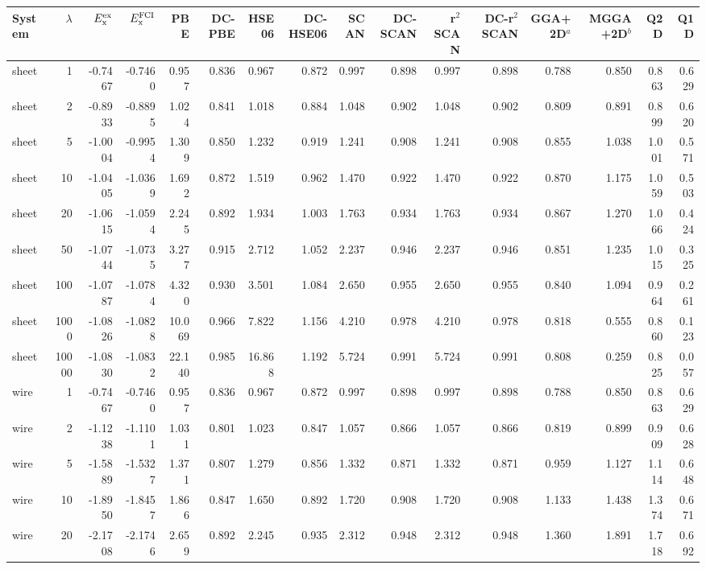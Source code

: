 \begin{tabular}{lrrrrrrrrrrrrrrr}
\toprule
System & $\lambda$ & $E_{\rm x}^{\rm ex}$ & $E_{\rm x}^{\rm FCI}$ & PBE & DC-PBE & HSE06 & DC-HSE06 & SCAN & DC-SCAN & r$^2$SCAN & DC-r$^2$SCAN & GGA+2D$^a$ & MGGA+2D$^b$ & Q2D & Q1D \\
\midrule
sheet & 1 & -0.7467 & -0.7460 & 0.957 & 0.836 & 0.967 & 0.872 & 0.997 & 0.898 & 0.997 & 0.898 & 0.788 & 0.850 & 0.863 & 0.629 \\
sheet & 2 & -0.8933 & -0.8895 & 1.024 & 0.841 & 1.018 & 0.884 & 1.048 & 0.902 & 1.048 & 0.902 & 0.809 & 0.891 & 0.899 & 0.620 \\
sheet & 5 & -1.0004 & -0.9954 & 1.309 & 0.850 & 1.232 & 0.919 & 1.241 & 0.908 & 1.241 & 0.908 & 0.855 & 1.038 & 1.001 & 0.571 \\
sheet & 10 & -1.0405 & -1.0369 & 1.692 & 0.872 & 1.519 & 0.962 & 1.470 & 0.922 & 1.470 & 0.922 & 0.870 & 1.175 & 1.059 & 0.503 \\
sheet & 20 & -1.0615 & -1.0594 & 2.245 & 0.892 & 1.934 & 1.003 & 1.763 & 0.934 & 1.763 & 0.934 & 0.867 & 1.270 & 1.066 & 0.424 \\
sheet & 50 & -1.0744 & -1.0735 & 3.277 & 0.915 & 2.712 & 1.052 & 2.237 & 0.946 & 2.237 & 0.946 & 0.851 & 1.235 & 1.015 & 0.325 \\
sheet & 100 & -1.0787 & -1.0784 & 4.320 & 0.930 & 3.501 & 1.084 & 2.650 & 0.955 & 2.650 & 0.955 & 0.840 & 1.094 & 0.964 & 0.261 \\
sheet & 1000 & -1.0826 & -1.0828 & 10.069 & 0.966 & 7.822 & 1.156 & 4.210 & 0.978 & 4.210 & 0.978 & 0.818 & 0.555 & 0.860 & 0.123 \\
sheet & 10000 & -1.0830 & -1.0832 & 22.140 & 0.985 & 16.868 & 1.192 & 5.724 & 0.991 & 5.724 & 0.991 & 0.808 & 0.259 & 0.825 & 0.057 \\
\midrule
wire & 1 & -0.7467 & -0.7460 & 0.957 & 0.836 & 0.967 & 0.872 & 0.997 & 0.898 & 0.997 & 0.898 & 0.788 & 0.850 & 0.863 & 0.629 \\
wire & 2 & -1.1238 & -1.1101 & 1.031 & 0.801 & 1.023 & 0.847 & 1.057 & 0.866 & 1.057 & 0.866 & 0.819 & 0.899 & 0.909 & 0.628 \\
wire & 5 & -1.5889 & -1.5327 & 1.371 & 0.807 & 1.279 & 0.856 & 1.332 & 0.871 & 1.332 & 0.871 & 0.959 & 1.127 & 1.114 & 0.648 \\
wire & 10 & -1.8950 & -1.8457 & 1.866 & 0.847 & 1.650 & 0.892 & 1.720 & 0.908 & 1.720 & 0.908 & 1.133 & 1.438 & 1.374 & 0.671 \\
wire & 20 & -2.1708 & -2.1746 & 2.659 & 0.892 & 2.245 & 0.935 & 2.312 & 0.948 & 2.312 & 0.948 & 1.360 & 1.891 & 1.718 & 0.692 \\

\end{tabular}
